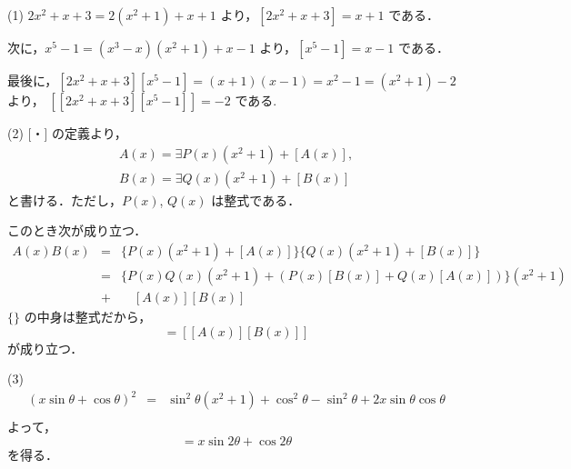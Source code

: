 \documentclass[main]{subfiles}
\begin{document}
\setcounter{prob}{3}
\begin{prob}

\end{prob}
\begin{pf}
(1) $2x^2+x+3 =2(x^2+1)+x+1$ より，$[2x^2+x+3] = x+1$ である．

次に，$x^5-1 = (x^3-x)(x^2+1)+x-1$ より，$[x^5-1] = x-1$ である．

最後に，$[2x^2+x+3][x^5-1] = (x+1)(x-1) = x^2-1 = (x^2+1)-2$ より，
$[[2x^2+x+3][x^5-1]] = -2$ である. 

(2) [・] の定義より， 
\begin{eqnarray*}
A(x) = \exists P(x)(x^2+1)+[A(x)], \\
B(x) = \exists Q(x)(x^2+1)+[B(x)]
\end{eqnarray*}
と書ける．ただし，$P(x)$, $Q(x)$ は整式である．

このとき次が成り立つ．
\begin{eqnarray*}
A(x)B(x) &=& \{P(x)(x^2+1)+[A(x)]\}\{Q(x)(x^2+1)+[B(x)]\} \\
				&=& \{P(x)Q(x)(x^2+1)+(P(x)[B(x)]+Q(x)[A(x)])\}(x^2+1) \\ 
				                                                        &+& \quad [A(x)][B(x)]
\end{eqnarray*}
$\{\}$ の中身は整式だから，
\begin{equation*}
[A(x)][B(x)] = [[A(x)][B(x)]]
\end{equation*}
が成り立つ．

(3) 
\begin{eqnarray*}
(x\sin\theta+\cos\theta)^2 &=& \sin^2\theta(x^2+1)+
										\cos^2\theta-\sin^2\theta+2x\sin\theta\cos\theta \\
\end{eqnarray*}
よって，
\begin{equation*}
[(x\sin\theta+\cos\theta)^2] = x\sin2\theta+\cos2\theta 
\end{equation*}
を得る．


\end{pf}
\end{document}
